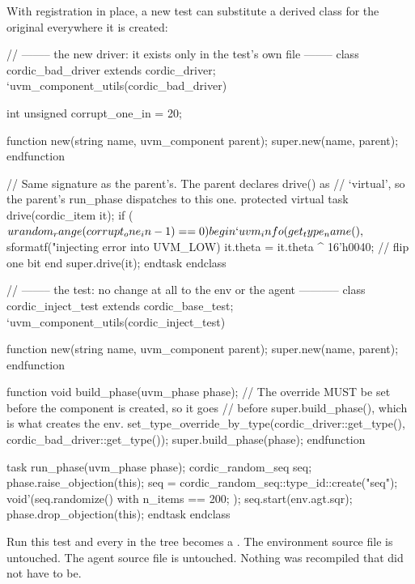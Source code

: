 %
With registration in place, a new test can substitute a derived class for the
original everywhere it is created:

\begin{uvmcode}[caption={An error-injecting driver, substituted by a test},label={lst:uvm:override}]
// -------- the new driver: it exists only in the test's own file --------
class cordic_bad_driver extends cordic_driver;
  `uvm_component_utils(cordic_bad_driver)

  int unsigned corrupt_one_in = 20;

  function new(string name, uvm_component parent);
    super.new(name, parent);
  endfunction

  // Same signature as the parent's.  The parent declares drive() as
  // `virtual', so the parent's run_phase dispatches to this one.
  protected virtual task drive(cordic_item it);
    if ($urandom_range(corrupt_one_in - 1) == 0) begin
      `uvm_info(get_type_name(),
                $sformatf("injecting error into %
                UVM_LOW)
      it.theta = it.theta ^ 16'h0040;      // flip one bit
    end
    super.drive(it);
  endtask
endclass

// -------- the test: no change at all to the env or the agent -----------
class cordic_inject_test extends cordic_base_test;
  `uvm_component_utils(cordic_inject_test)

  function new(string name, uvm_component parent);
    super.new(name, parent);
  endfunction

  function void build_phase(uvm_phase phase);
    // The override MUST be set before the component is created, so it goes
    // before super.build_phase(), which is what creates the env.
    set_type_override_by_type(cordic_driver::get_type(),
                              cordic_bad_driver::get_type());
    super.build_phase(phase);
  endfunction

  task run_phase(uvm_phase phase);
    cordic_random_seq seq;
    phase.raise_objection(this);
    seq = cordic_random_seq::type_id::create("seq");
    void'(seq.randomize() with { n_items == 200; });
    seq.start(env.agt.sqr);
    phase.drop_objection(this);
  endtask
endclass
\end{uvmcode}

Run this test and every  in the tree becomes a
. The environment source file is untouched. The
agent source file is untouched. Nothing was recompiled that did not have to
be.

